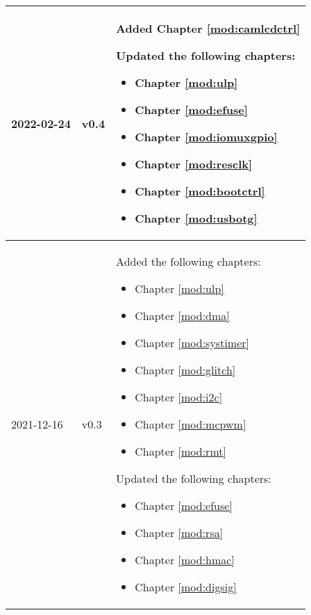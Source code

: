 \begin{longtable}[l]{ | m{2cm} | m{1.5cm} | m{12cm} | }
    2022-02-24    & v0.4  &
    Added Chapter \ref{mod:camlcdctrl} \textit{\nameref{mod:camlcdctrl}}

    Updated the following chapters:
        \begin{itemize}
            \item Chapter \ref{mod:ulp} \textit{\nameref{mod:ulp}} %
            \item Chapter \ref{mod:efuse} \textit{\nameref{mod:efuse}}
            \item Chapter \ref{mod:iomuxgpio} \textit{\nameref{mod:iomuxgpio}} %
            \item Chapter \ref{mod:resclk} \textit{\nameref{mod:resclk}}
            \item Chapter \ref{mod:bootctrl} \textit{\nameref{mod:bootctrl}} %
            \item Chapter \ref{mod:usbotg} \textit{\nameref{mod:usbotg}}
             \end{itemize}
    \\\hline
    2021-12-16 & v0.3 &
    Added the following chapters:
        \begin{itemize}
            \item Chapter \ref{mod:ulp} \textit{\nameref{mod:ulp}}
            \item Chapter \ref{mod:dma} \textit{\nameref{mod:dma}}
            \item Chapter \ref{mod:systimer} \textit{\nameref{mod:systimer}}
            \item Chapter \ref{mod:glitch} \textit{\nameref{mod:glitch}}
            \item Chapter \ref{mod:i2c} \textit{\nameref{mod:i2c}}
            \item Chapter \ref{mod:mcpwm} \textit{\nameref{mod:mcpwm}}
            \item Chapter \ref{mod:rmt} \textit{\nameref{mod:rmt}}
        \end{itemize}
    Updated the following chapters:
        \begin{itemize}
            \item Chapter \ref{mod:efuse} \textit{\nameref{mod:efuse}}
            \item Chapter \ref{mod:rsa} \textit{\nameref{mod:rsa}}
            \item Chapter \ref{mod:hmac} \textit{\nameref{mod:hmac}}
            \item Chapter \ref{mod:digsig} \textit{\nameref{mod:digsig}}
        \end{itemize}
    \\\hline


\end{longtable}
